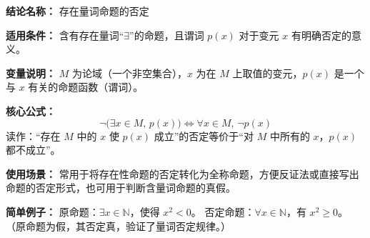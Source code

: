 \textbf{结论名称：} 存在量词命题的否定

\textbf{适用条件：} 含有存在量词“\(\exists\)”的命题，且谓词 \(p(x)\) 对于变元 \(x\) 有明确否定的意义。

\textbf{变量说明：}  $M$ 为论域（一个非空集合），$x$ 为在 $M$ 上取值的变元，$p(x)$ 是一个与 $x$ 有关的命题函数（谓词）。

\textbf{核心公式：} 
\[
\boxed{\neg \big( \exists x \in M ,\, p(x) \big) \iff \forall x \in M ,\, \neg p(x)}
\]
读作：“存在 $M$ 中的 $x$ 使 $p(x)$ 成立”的否定等价于“对 $M$ 中所有的 $x$，$p(x)$ 都不成立”。

\textbf{使用场景：} 常用于将存在性命题的否定转化为全称命题，方便反证法或直接写出命题的否定形式，也可用于判断含量词命题的真假。

\textbf{简单例子：} 
原命题：$\exists x \in \mathbb{N}$，使得 $x^2 < 0$。 
否定命题：$\forall x \in \mathbb{N}$，有 $x^2 \geq 0$。 
（原命题为假，其否定真，验证了量词否定规律。）